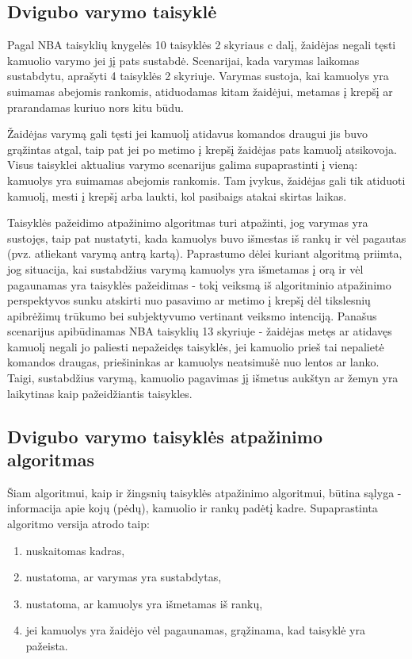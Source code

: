 \documentclass{VUMIFPSbakalaurinis}
\begin{document}
\subsection{Dvigubo varymo taisyklė}
Pagal NBA taisyklių knygelės 10 taisyklės 2 skyriaus c dalį, žaidėjas negali tęsti kamuolio varymo jei jį pats sustabdė. Scenarijai, kada varymas laikomas sustabdytu, aprašyti 4 taisyklės 2 skyriuje. Varymas sustoja, kai kamuolys yra suimamas abejomis rankomis, atiduodamas kitam žaidėjui, metamas į krepšį ar prarandamas kuriuo nors kitu būdu. 

Žaidėjas varymą gali tęsti jei kamuolį atidavus komandos draugui jis buvo grąžintas atgal, taip pat jei po metimo į krepšį žaidėjas pats kamuolį atsikovoja. Visus taisyklei aktualius varymo scenarijus galima supaprastinti į vieną: kamuolys yra suimamas abejomis rankomis. Tam įvykus, žaidėjas gali tik atiduoti kamuolį, mesti į krepšį arba laukti, kol pasibaigs atakai skirtas laikas. 

Taisyklės pažeidimo atpažinimo algoritmas turi atpažinti, jog varymas yra sustojęs, taip pat nustatyti, kada kamuolys buvo išmestas iš rankų ir vėl pagautas (pvz. atliekant varymą antrą kartą). Paprastumo dėlei kuriant algoritmą priimta, jog situacija, kai sustabdžius varymą kamuolys yra išmetamas į orą ir vėl pagaunamas yra taisyklės pažeidimas - tokį veiksmą iš algoritminio atpažinimo perspektyvos sunku atskirti nuo pasavimo ar metimo į krepšį dėl tikslesnių apibrėžimų trūkumo bei subjektyvumo vertinant veiksmo intenciją. Panašus scenarijus apibūdinamas NBA taisyklių 13 skyriuje - žaidėjas metęs ar atidavęs kamuolį negali jo paliesti nepažeidęs taisyklės, jei kamuolio prieš tai nepalietė komandos draugas, priešininkas ar kamuolys neatsimušė nuo lentos ar lanko. Taigi, sustabdžius varymą, kamuolio pagavimas jį išmetus aukštyn ar žemyn yra laikytinas kaip pažeidžiantis taisykles. 

\subsection{Dvigubo varymo taisyklės atpažinimo algoritmas}

Šiam algoritmui, kaip ir žingsnių taisyklės atpažinimo algoritmui, būtina sąlyga - informacija apie kojų (pėdų), kamuolio ir rankų padėtį kadre. Supaprastinta algoritmo versija atrodo taip: 

\begin{enumerate}
 	\item nuskaitomas kadras,
 	\item nustatoma, ar varymas yra sustabdytas,
 	\item nustatoma, ar kamuolys yra išmetamas iš rankų,
 	\item jei kamuolys yra žaidėjo vėl pagaunamas, grąžinama, kad taisyklė yra pažeista.
\end{enumerate}
\end{document}
